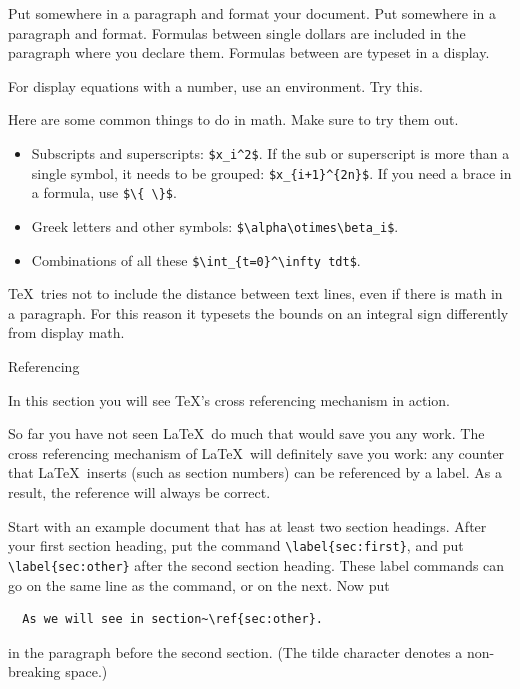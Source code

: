\practical
{Put  somewhere in a paragraph and format your document.
Put  \n{\\[x+y\\]} somewhere in a paragraph and format.}
{Formulas between single dollars are included in the paragraph where
  you declare them. Formulas between \n{\\[...\\]} are typeset in a
  display.}
{}

For display
equations with a number, use an  environment. Try this.

Here are some common things to do in math. Make sure to try them out.
\begin{itemize}
\item Subscripts and superscripts: \verb-$x_i^2$-. If the sub or superscript
  is more than a single symbol, it needs to be grouped:
  \verb-$x_{i+1}^{2n}$-. If you need a brace in a formula, use
  \verb-$\{ \}$-.
\item Greek letters and other symbols: \verb-$\alpha\otimes\beta_i$-.
\item Combinations of all these \verb-$\int_{t=0}^\infty tdt$-.
\end{itemize}

{\TeX\ tries not to include the distance between text lines, even if
  there is math in a paragraph. For this reason it typesets the bounds
  on an integral sign differently from display math.}{}

 {Referencing}

\begin{purpose}
  In this section you will see \TeX's cross referencing mechanism in action.
\end{purpose}

So far you have not seen \LaTeX\ do much that would save you any
work. The cross referencing mechanism of \LaTeX\ will definitely save
you work: any counter that \LaTeX\ inserts (such as section numbers)
can be referenced by a label. As a result, the reference will always
be correct.

Start with an example
document that has at least two section headings. After your first section
heading, put the command \verb+\label{sec:first}+,
and put \verb+\label{sec:other}+ after the second section
heading. These label commands can go on the same line as the
 command, or on the next.
Now put 
\begin{verbatim}
  As we will see in section~\ref{sec:other}.
\end{verbatim}
in the paragraph before the second section. (The tilde character
denotes a non-breaking space.) 


